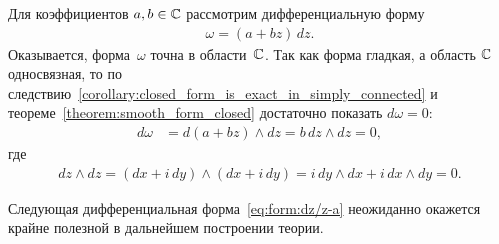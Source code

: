 \documentclass[../complex-analysis.tex]{subfiles}
\begin{document}
\begin{exmpl}
 \label{example:form_a_plus_b_times_z_dz}
 Для коэффициентов $ a,b\in\mathbb{C} $ рассмотрим дифференциальную форму
 \begin{align*}
  \omega = (a + bz)\,dz.
 \end{align*} Оказывается, форма~$ \omega $ точна в области~$ \mathbb{C} $. Так как форма гладкая, а область $ \mathbb{C} $ односвязная, то по следствию~\ref{corollary:closed_form_is_exact_in_simply_connected} и теореме~\ref{theorem:smooth_form_closed} достаточно показать $ d\omega = 0 $:
 \begin{align*}
  d\omega &= d(a + bz)\land dz = b\,dz \land dz = 0,
 \end{align*} где
 \begin{align*}
  dz\land dz = (dx + i\,dy) \land (dx + i\,dy) = i\,dy\land dx + i\,dx\land dy = 0.
 \end{align*}
\end{exmpl}

Следующая дифференциальная форма~\eqref{eq:form:dz/z-a} неожиданно окажется крайне полезной в дальнейшем построении теории.
\end{document}
